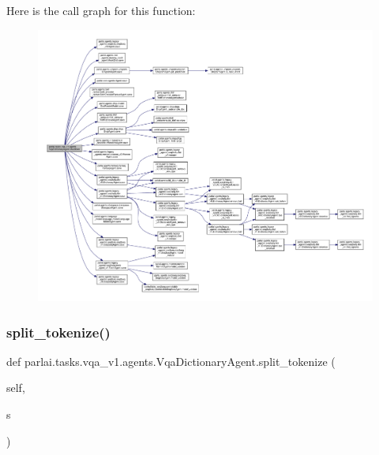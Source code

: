 Here is the call graph for this function\+:
\nopagebreak
\begin{figure}[H]
\begin{center}
\leavevmode
\includegraphics[width=350pt]{classparlai_1_1tasks_1_1vqa__v1_1_1agents_1_1VqaDictionaryAgent_afcebdb70582204709f5e4365dde00bcb_cgraph}
\end{center}
\end{figure}
\mbox{\label{classparlai_1_1tasks_1_1vqa__v1_1_1agents_1_1VqaDictionaryAgent_a59f1738f5c3fdcadd0a8ece0d53c5d6e}} 
\subsubsection{\texorpdfstring{split\+\_\+tokenize()}{split\_tokenize()}}
{\footnotesize\ttfamily def parlai.\+tasks.\+vqa\+\_\+v1.\+agents.\+Vqa\+Dictionary\+Agent.\+split\+\_\+tokenize (\begin{DoxyParamCaption}\item[{}]{self,  }\item[{}]{s }\end{DoxyParamCaption})}



